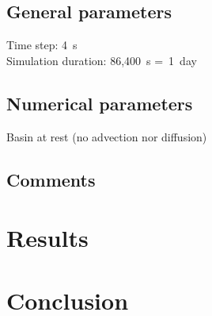 \subsection{General parameters}
%
Time step: 4~s\\
Simulation duration: 86,400~s =~1~day
%
%
%
\subsection{Numerical parameters}
%
Basin at rest (no advection nor diffusion)
%
\subsection{Comments}
%
%
%
\section{Results}
%

%
\section{Conclusion}
%

%
%
